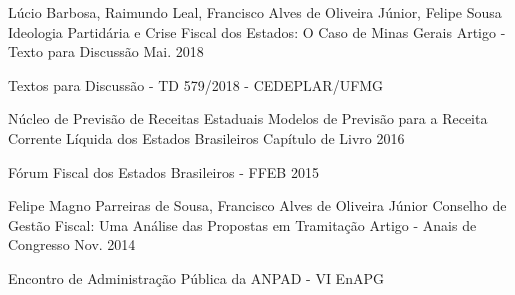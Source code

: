 \begin{cventries}

  \cventry
    {Lúcio Barbosa, Raimundo Leal, Francisco Alves de Oliveira Júnior, Felipe Sousa}
    {Ideologia Partidária e Crise Fiscal dos Estados: O Caso de Minas Gerais}
    {Artigo - Texto para Discussão}
    {Mai. 2018}
    {
      \begin{cvitems}
        \item {Textos para Discussão - TD 579/2018 - CEDEPLAR/UFMG}
      \end{cvitems}
    }

  \cventry
    {Núcleo de Previsão de Receitas Estaduais}
    {Modelos de Previsão para a Receita Corrente Líquida dos Estados Brasileiros}
    {Capítulo de Livro}
    {2016}
    {
      \begin{cvitems}
        \item {Fórum Fiscal dos Estados Brasileiros - FFEB 2015}
      \end{cvitems}
    }

  \cventry
    {Felipe Magno Parreiras de Sousa, Francisco Alves de Oliveira Júnior} 
    {Conselho de Gestão Fiscal: Uma Análise das Propostas em Tramitação}
    {Artigo - Anais de Congresso}
    {Nov. 2014}
    {
      \begin{cvitems}
        \item {Encontro de Administração Pública da ANPAD - VI EnAPG}
      \end{cvitems}
    }

\end{cventries}